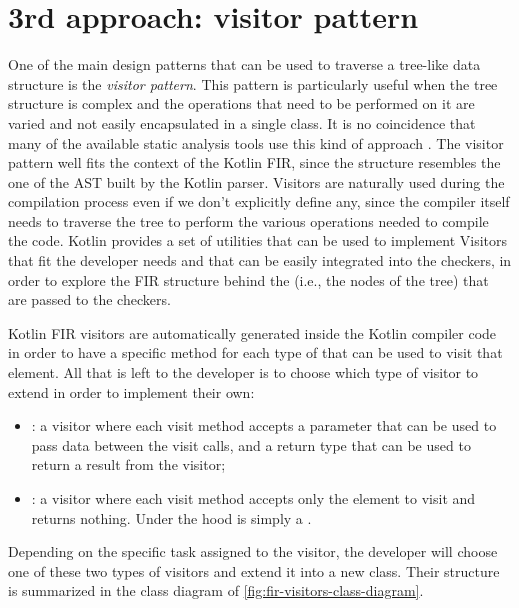 \documentclass[12pt,a4paper,openright,twoside]{book}
\begin{document}
\section{3rd approach: visitor pattern}

One of the main design patterns that can be used to traverse a tree-like data
structure is the \emph{visitor pattern}. This pattern is particularly useful
when the tree structure is complex and the operations that need to be performed
on it are varied and not easily encapsulated in a single class. It is no
coincidence that many of the available static analysis tools use this kind of
approach \cite{DBLP:journals/jss/LenarduzziPSLP23}.
%
The visitor pattern well fits the context of the Kotlin \ac{FIR}, since the
structure resembles the one of the \ac{AST} built by the Kotlin parser. 
Visitors are naturally used during the compilation process even if we don't
explicitly define any, since the compiler itself needs to traverse the tree to
perform the various operations needed to compile the code.
%
Kotlin provides a set of utilities that can be used to implement
Visitors that fit the developer needs and that can be easily integrated into the
checkers, in order to explore the \ac{FIR} structure behind the
 (i.e., the nodes of the tree) that are passed to the
checkers.

Kotlin \ac{FIR} visitors are automatically generated inside the Kotlin compiler 
code in order to have a specific method for each type of 
that can be used to visit that element. All that is left to the developer is to
choose which type of visitor to extend in order to implement their own:

\begin{itemize}
  \item {}: a visitor where each visit method accepts
a  parameter that can be used to pass data between the visit calls,
and a return type  that can be used to return a result from the 
visitor;
  \item {}: a visitor where each visit method accepts
only the element to visit and returns nothing. Under the hood is simply a 
.
\end{itemize}

Depending on the specific task assigned to the visitor, the developer will
choose one of these two types of visitors and extend it into a new class. Their
structure is summarized in the class diagram of
\cref{fig:fir-visitors-class-diagram}.
\end{document}
